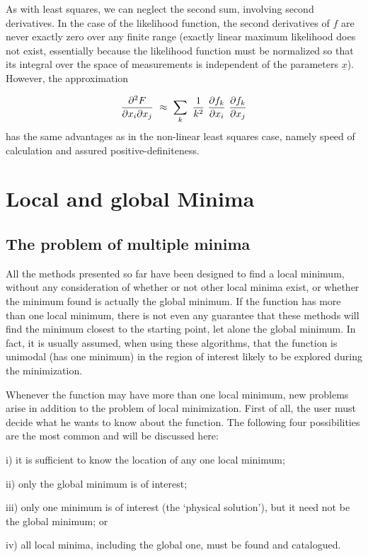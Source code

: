  
 As with least squares, we can neglect the second sum, involving second
derivatives.  In the case of the likelihood function, the second derivatives
of $f$ are never exactly zero over any finite range (exactly linear
maximum likelihood does not exist, essentially because the likelihood
function must be normalized so that its integral over the space of
measurements is independent of the parameters ${\underline{x}}$).  However, the
approximation
 
$${\partial ^2F\over \partial x_i\partial x_j}~\approx~\sum_k~{1\over k^2}~{\partial f_k\over
\partial x_i}~{\partial f_k\over \partial x_j}$$
 has the same advantages as in the non-linear least
squares case, namely speed of calculation and assured positive-definiteness.
 
\chapter{Local and global Minima}
 
\section{The problem of multiple minima}
 
All the methods presented so far have been designed to find a local
minimum, without any consideration of whether or not other local minima
exist, or whether the minimum found is actually the global minimum.
If the function has more than one local minimum, there is not even any
guarantee that these methods will find the minimum closest to the
starting point, let alone the global minimum.  In fact, it is usually
assumed, when using these algorithms, that the function is unimodal
(has one minimum) in the region of interest likely to be explored
during the minimization.
 
     Whenever the function may have more than one local minimum, new
problems arise in addition to the problem  of local minimization. First
of all, the user must decide what he wants to know about the function.
The following four possibilities are the most common and will be
discussed here:
 
  i) it is sufficient to know the location of any one local minimum;
 
 ii) only the global minimum is
of interest;
 
 iii) only one minimum is of interest (the `physical solution'), but it
 need not be the global minimum; or
 
 iv) all local minima, including the global one, must be found and
 catalogued.
 
